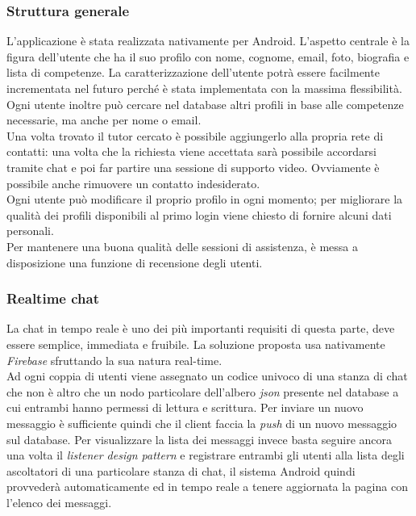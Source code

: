 \documentclass[conference]{IEEEtran}
\begin{document}
		\subsubsection{Struttura generale}
			L'applicazione è stata realizzata nativamente per Android. L'aspetto centrale è la figura dell'utente che ha il suo profilo
			con nome, cognome, email, foto, biografia e lista di competenze. La caratterizzazione dell'utente potrà essere facilmente
			incrementata nel futuro perché è stata implementata con la massima flessibilità.\\
			Ogni utente inoltre può cercare nel database altri profili in base alle competenze necessarie, ma anche per nome o email.\\
			Una volta trovato il tutor cercato è possibile aggiungerlo alla propria rete di contatti: una volta che la richiesta viene
			accettata sarà possibile accordarsi tramite chat e poi far partire una sessione di supporto video. Ovviamente è possibile
			anche rimuovere un contatto indesiderato.\\
			Ogni utente può modificare il proprio profilo in ogni momento; per migliorare la qualità dei profili disponibili
			al primo login viene chiesto di fornire alcuni dati personali.\\
			Per mantenere una buona qualità delle sessioni di assistenza, è messa a disposizione una funzione di recensione degli utenti.

		\subsubsection{Realtime chat}
			La chat in tempo reale è uno dei più importanti requisiti di questa parte, deve essere semplice, immediata e fruibile.
			La soluzione proposta usa nativamente \textit{Firebase} sfruttando la sua natura real-time.\\
			Ad ogni coppia di utenti viene assegnato un codice univoco di una stanza di chat che non è altro che un nodo particolare
			dell'albero \textit{json} presente nel database a cui entrambi hanno permessi di lettura e scrittura. Per inviare un nuovo
			messaggio è sufficiente quindi che il client faccia la \textit{push} di un nuovo messaggio sul database. Per 
			visualizzare la lista dei messaggi invece basta seguire ancora una volta il \textit{listener design pattern} e registrare
			entrambi gli utenti alla lista degli ascoltatori di una particolare stanza di chat, il sistema Android quindi provvederà
			automaticamente ed in tempo reale a tenere aggiornata la pagina con l'elenco dei messaggi.
\end{document}

